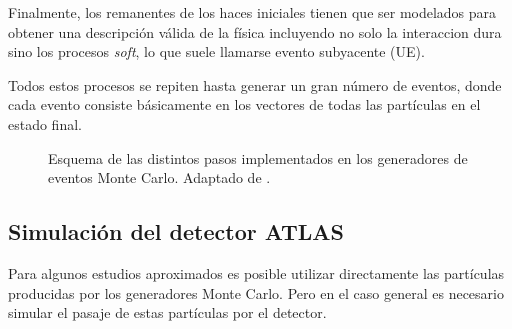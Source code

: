 Finalmente, los remanentes de los haces iniciales tienen que ser modelados
para obtener una descripción válida de la física incluyendo no solo la
interaccion dura sino los procesos \emph{soft}, lo que suele llamarse evento
subyacente (UE).

Todos estos procesos se repiten hasta generar un gran número de eventos, donde cada
evento consiste básicamente en los vectores de todas las partículas en el estado
final.






\begin{figure}[!h]
  \centering

  \scalebox{0.9}{}

  \caption{Esquema de las distintos pasos implementados en los generadores de
    eventos Monte Carlo. Adaptado de \cite{Baer:2009tk}.}
  \label{fig:mc_event_generator}

\end{figure}


\subsection{Simulación del detector ATLAS}
\label{sec:sim_atlas}

Para algunos estudios aproximados es posible utilizar directamente las
partículas producidas por los generadores Monte Carlo. Pero en el caso general
es necesario simular el pasaje de estas partículas por el detector.

